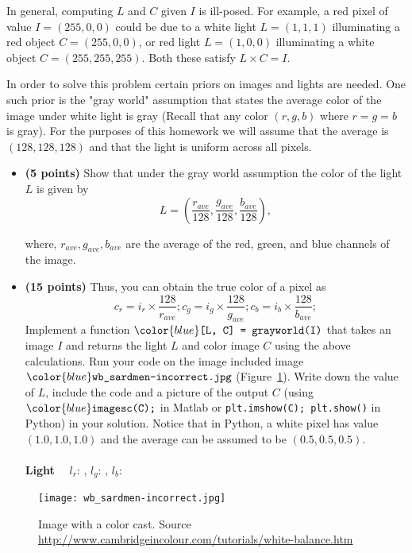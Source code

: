 \documentclass[10pt,letterpaper]{article}
\newcommand{\cmd}[1] {{\color{blue}\texttt{#1}}}
\begin{document}
In general, computing $L$ and $C$ given $I$ is ill-posed. For example, a red pixel of value $I=(255,0,0)$ could be due to a white light $L=(1,1,1)$ illuminating a red object $C=(255,0,0)$, or red light $L=(1,0,0)$ illuminating a white object $C=(255,255,255)$. Both these satisfy $L\times C = I$.

In order to solve this problem certain priors on images and lights are needed. One such prior is the "gray world" assumption that states the average color of the image under white light is gray (Recall that any color $(r,g,b)$ where $r=g=b$ is gray). For the purposes of this homework we will assume that the average is $(128,128,128)$ and that the light is uniform across all pixels.

\begin{itemize}
\item \textbf{(5 points)} Show that under the gray world assumption the color of the light $L$ is given by 
\[
	L = \left(\frac{r_{ave}}{128}, \frac{g_{ave}}{128}, \frac{b_{ave}}{128}\right),
\]

where, $r_{ave}, g_{ave}, b_{ave}$ are the average of the red, green, and blue channels of the image. 

\item \textbf{(15 points)} Thus, you can obtain the true color of a pixel as
\[
	c_r = i_r \times \frac{128}{r_{ave}}; 
	c_g = i_g \times \frac{128}{g_{ave}}; 
	c_b = i_b \times \frac{128}{b_{ave}}; 
\]
Implement a function $\cmd{[L, C] = grayworld(I)}$ that takes an image $I$ and returns the light $L$ and color image $C$ using the above calculations. Run your code on the image included image $\cmd{wb\_sardmen-incorrect.jpg}$ (Figure~\ref{fig:color}).  Write down the value of $L$, include the code and a picture of the output $C$ (using $\cmd{imagesc(C);}$ in Matlab or \cmd{plt.imshow(C); plt.show()} in Python) in your solution. Notice that in Python, a white pixel has value $(1.0, 1.0, 1.0)$ and the average can be assumed to be $(0.5, 0.5, 0.5)$.\\ \\
\textbf{Light}~~ $l_r$: \underline{\hspace{2cm}}, $l_g$: \underline{\hspace{3cm}}, $l_b$:\underline{\hspace{3cm}}
\end{itemize}

\begin{figure}[h]
\centering
\texttt{[image: wb\_sardmen-incorrect.jpg]}
\caption{\label{fig:color} Image with a color cast. Source \url{ http://www.cambridgeincolour.com/tutorials/white-balance.htm}}
\end{figure}
\end{document}
